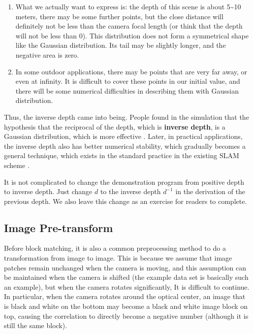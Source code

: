\begin{enumerate}
	\item What we actually want to express is: the depth of this scene is about 5\textasciitilde10 meters, there may be some further points, but the close distance will definitely not be less than the camera focal length (or think that the depth will not be less than 0). This distribution does not form a symmetrical shape like the Gaussian distribution. Its tail may be slightly longer, and the negative area is zero.
	\item In some outdoor applications, there may be points that are very far away, or even at infinity. It is difficult to cover these points in our initial value, and there will be some numerical difficulties in describing them with Gaussian distribution.
\end{enumerate}

Thus, the inverse depth came into being. People found in the simulation that the hypothesis that the reciprocal of the depth, which is \textbf{inverse depth}, is a Gaussian distribution, which is more effective {\cite{Civera2008}}. Later, in practical applications, the inverse depth also has better numerical stability, which gradually becomes a general technique, which exists in the standard practice in the existing SLAM scheme {\cite{Forster2014, Engel2014, Mur- Artal2015}}.

It is not complicated to change the demonstration program from positive depth to inverse depth. Just change $d$ to the inverse depth $d^{-1}$ in the derivation of the previous depth. We also leave this change as an exercise for readers to complete.

\subsection{Image Pre-transform}
Before block matching, it is also a common preprocessing method to do a transformation from image to image. This is because we assume that image patches remain unchanged when the camera is moving, and this assumption can be maintained when the camera is shifted (the example data set is basically such an example), but when the camera rotates significantly, It is difficult to continue. In particular, when the camera rotates around the optical center, an image that is black and white on the bottom may become a black and white image block on top, causing the correlation to directly become a negative number (although it is still the same block).

